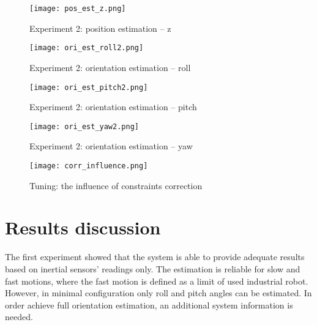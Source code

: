 \begin{figure}[p]
	\centering
	\texttt{[image: pos\_est\_z.png]}
	\caption{Experiment 2: position estimation -- z}
	\label{pos_est_z}
\end{figure}

\begin{figure}[p]
	\centering
	\texttt{[image: ori\_est\_roll2.png]}
	\caption{Experiment 2: orientation estimation -- roll}
	\label{ori_est_roll2}
\end{figure}

\begin{figure}[p]
	\centering
	\texttt{[image: ori\_est\_pitch2.png]}
	\caption{Experiment 2: orientation estimation -- pitch}
	\label{ori_est_pitch2}
\end{figure}


\begin{figure}[p]
	\centering
	\texttt{[image: ori\_est\_yaw2.png]}
	\caption{Experiment 2: orientation estimation -- yaw}
	\label{ori_est_yaw2}
\end{figure}


\begin{figure}[p]
	\centering
	\texttt{[image: corr\_influence.png]}
	\caption{Tuning: the influence of constraints correction}
	\label{corr_strength}
\end{figure}

\section{Results discussion}

The first experiment showed that the system is able to provide adequate results based on inertial sensors' readings only. The estimation is reliable for slow and fast motions, where the fast motion is defined as a limit of used industrial robot. However, in minimal configuration only roll and pitch angles can be estimated. In order achieve full orientation estimation, an additional system information is needed.\\

